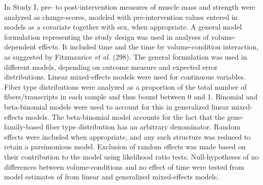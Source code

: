 \documentclass[twoside,10pt]{gihclass} %
\begin{document}
In Study I, pre- to post-intervention measures of muscle mass and strength were analyzed as change-scores, modeled with pre-intervention values entered in models as a covariate together with sex, when appropriate. A general model formulation representing the study design was used in analyses of volume-dependent effects. It included time and the time by volume-condition interaction, as suggested by Fitzmaurice \emph{et al.} (298).
The general formulation was used in different models, depending on outcome measure and expected error distributions.
Linear mixed-effects models were used for continuous variables.
Fiber type distributions were analyzed as a proportion of the total number of fibers/transcripts in each sample and thus bound between 0 and 1. Binomial and beta-binomial models were used to account for this in generalized linear mixed-effects models.
The beta-binomial model accounts for the fact that the gene-family-based fiber type distribution has an arbitrary denominator.
Random effects were included when appropriate, and any such structure was reduced to retain a parsimonious model. Exclusion of random effects was made based on their contribution to the model using likelihood ratio tests.
Null-hypotheses of no differences between volume-conditions and no effect of time were tested from model estimates of from linear and generalized mixed-effects models.
\end{document}

